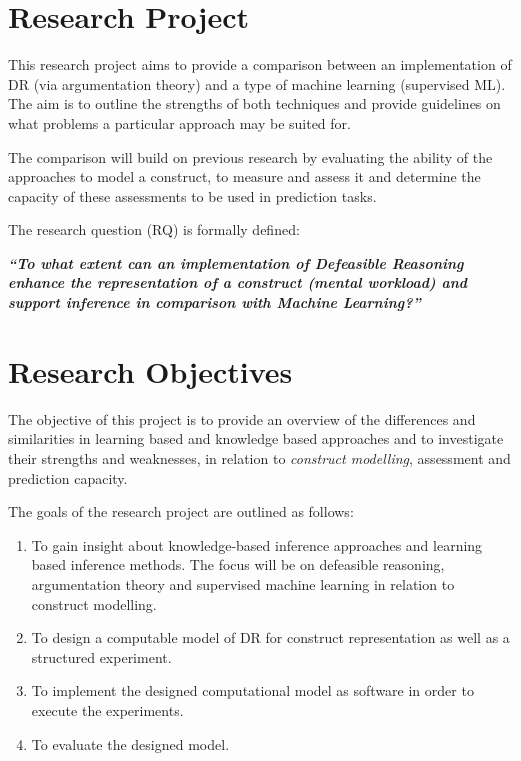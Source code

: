 \section{Research Project}


This research project aims to provide a comparison between an implementation of DR (via argumentation theory) and a type of machine learning (supervised ML). The aim is to outline the strengths of both techniques and provide guidelines on what problems a particular approach may be suited for. 

The comparison will build on previous research by evaluating the ability of the approaches to model a construct, to measure and assess it and determine the capacity of these assessments to be used in prediction tasks. 

The research question (RQ) is formally defined:

\textit{\textbf{``To what extent can an implementation of Defeasible Reasoning enhance the representation of a construct (mental workload) and support inference in comparison with Machine Learning?''}}


\section{Research Objectives}

The objective of this project is to provide an overview of the differences and similarities in learning based and knowledge based approaches and to investigate their strengths and weaknesses, in relation to \textit{construct modelling}, assessment and prediction capacity.

The goals of the research project are outlined as follows:

\begin{enumerate}
  \item To gain insight about knowledge-based inference approaches and learning based inference methods. The focus will be on defeasible reasoning, argumentation theory and supervised machine learning in relation to construct modelling.
  \item To design a computable model of DR for construct representation as well as a structured experiment.
  \item To implement the designed computational model as software in order to execute the experiments.
  \item To evaluate the designed model.
\end{enumerate}

